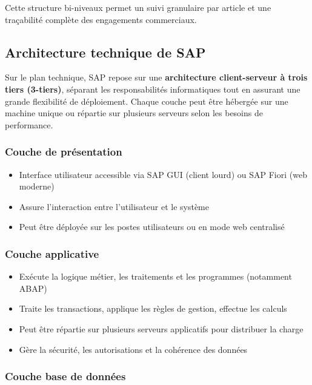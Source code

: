 \documentclass[12pt,a4paper,oneside]{report}
\begin{document}
Cette structure bi-niveaux permet un suivi granulaire par article et une traçabilité complète des engagements commerciaux.

\subsection{Architecture technique de SAP}\label{ch2:mm-arch-tech}

Sur le plan technique, SAP repose sur une \textbf{architecture client-serveur à trois tiers (3-tiers)}, séparant 
les responsabilités informatiques tout en assurant une grande flexibilité de déploiement. Chaque couche peut être 
hébergée sur une machine unique ou répartie sur plusieurs serveurs selon les besoins de performance.

\subsubsection{Couche de présentation}\label{ch2:mm-arch-pres}

\begin{itemize}[label=---, itemsep=0.15em]
	\item Interface utilisateur accessible via SAP GUI (client lourd) ou SAP Fiori (web moderne)
	\item Assure l'interaction entre l'utilisateur et le système
	\item Peut être déployée sur les postes utilisateurs ou en mode web centralisé
\end{itemize}

\subsubsection{Couche applicative}\label{ch2:mm-arch-app}

\begin{itemize}[label=\textbullet, itemsep=0.2em]
	\item Exécute la logique métier, les traitements et les programmes (notamment ABAP)
	\item Traite les transactions, applique les règles de gestion, effectue les calculs
	\item Peut être répartie sur plusieurs serveurs applicatifs pour distribuer la charge
	\item Gère la sécurité, les autorisations et la cohérence des données
\end{itemize}

\subsubsection{Couche base de données}\label{ch2:mm-arch-bdd}
\end{document}
